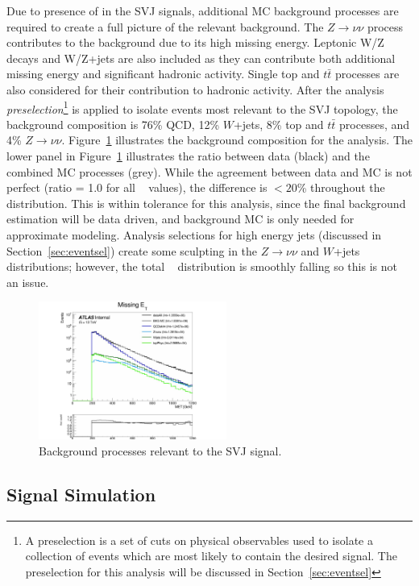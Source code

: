 Due to presence of \met in the SVJ signals, additional MC background processes are required to create a full picture of the relevant background. 
The $Z\rightarrow \nu\nu$ process contributes to the background due to its high missing energy. 
Leptonic W/Z decays and W/Z+jets are also included as they can contribute both additional missing energy and significant hadronic activity.
Single top and $t\bar{t}$ processes are also considered for their contribution to hadronic activity.
After the analysis \textit{preselection}\footnote{A preselection is a set of cuts on physical observables used to isolate a collection of events which are most likely to contain the desired signal. The preselection for this analysis will be discussed in Section~\ref{sec:eventsel}} is applied to isolate events most relevant to the SVJ topology, the background composition is 76\% QCD, 12\% $W$+jets, 8\% top and $t\bar{t}$ processes, and 4\% $Z\rightarrow \nu\nu$.  
Figure~\ref{fig:bkg_mc} illustrates the background composition for the analysis.
The lower panel in Figure~\ref{fig:bkg_mc} illustrates the ratio between data (black) and the combined MC processes (grey).
While the agreement between data and MC is not perfect (ratio = 1.0 for all \met~ values), the difference is $<20$\% throughout the distribution.
This is within tolerance for this analysis, since the final background estimation will be data driven, and background MC is only needed for approximate modeling.
Analysis selections for high energy jets (discussed in Section~\ref{sec:eventsel}) create some sculpting in the $Z\rightarrow \nu\nu$ and $W$+jets distributions; however, the total \met~ distribution is smoothly falling so this is not an issue.

\begin{figure}
        \centering
	\includegraphics[width=0.55\textwidth]{figures/ch6/bkg_mc}
	\caption{Background processes relevant to the SVJ signal. 
	\label{fig:bkg_mc}}
\end{figure}

\subsection{Signal Simulation}
\label{subsec:signals}

